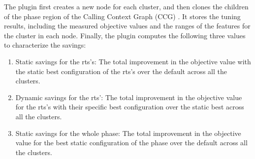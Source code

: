 The plugin first creates a new node for each cluster, and then clones the children of the phase region of the Calling Context Graph (CCG) . It stores the tuning results, including the measured objective values and the ranges of the features for the cluster in each node. Finally, the plugin computes the following three values to characterize the savings:
\begin{enumerate}
	\item Static savings for the rts's: The total improvement in the objective value with the static best configuration of the rts’s over the default across all the clusters.
	\item Dynamic savings for the rts’: The total improvement in the objective value for the rts’s with their specific best configuration over the static best across all the clusters.
	\item Static savings for the whole phase: The total improvement in the objective value for the best static configuration of the phase over the default across all the clusters.
\end{enumerate}


